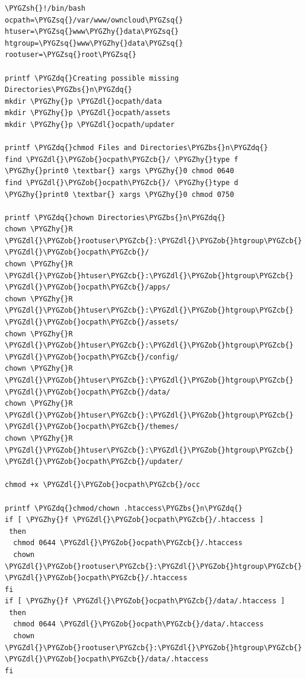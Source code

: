 \documentclass[letterpaper,10pt,english]{sphinxmanual}
\def\PYGZbs{\char`\\}
\def\PYGZob{\char`\{}
\def\PYGZcb{\char`\}}
\def\PYGZsh{\char`\#}
\def\PYGZdl{\char`\$}
\def\PYGZhy{\char`\-}
\def\PYGZsq{\char`\'}
\def\PYGZdq{\char`\"}
\renewcommand\PYGZsq{\textquotesingle}
\begin{document}
\begin{Verbatim}[commandchars=\\\{\}]
\PYGZsh{}!/bin/bash
ocpath=\PYGZsq{}/var/www/owncloud\PYGZsq{}
htuser=\PYGZsq{}www\PYGZhy{}data\PYGZsq{}
htgroup=\PYGZsq{}www\PYGZhy{}data\PYGZsq{}
rootuser=\PYGZsq{}root\PYGZsq{}

printf \PYGZdq{}Creating possible missing Directories\PYGZbs{}n\PYGZdq{}
mkdir \PYGZhy{}p \PYGZdl{}ocpath/data
mkdir \PYGZhy{}p \PYGZdl{}ocpath/assets
mkdir \PYGZhy{}p \PYGZdl{}ocpath/updater

printf \PYGZdq{}chmod Files and Directories\PYGZbs{}n\PYGZdq{}
find \PYGZdl{}\PYGZob{}ocpath\PYGZcb{}/ \PYGZhy{}type f \PYGZhy{}print0 \textbar{} xargs \PYGZhy{}0 chmod 0640
find \PYGZdl{}\PYGZob{}ocpath\PYGZcb{}/ \PYGZhy{}type d \PYGZhy{}print0 \textbar{} xargs \PYGZhy{}0 chmod 0750

printf \PYGZdq{}chown Directories\PYGZbs{}n\PYGZdq{}
chown \PYGZhy{}R \PYGZdl{}\PYGZob{}rootuser\PYGZcb{}:\PYGZdl{}\PYGZob{}htgroup\PYGZcb{} \PYGZdl{}\PYGZob{}ocpath\PYGZcb{}/
chown \PYGZhy{}R \PYGZdl{}\PYGZob{}htuser\PYGZcb{}:\PYGZdl{}\PYGZob{}htgroup\PYGZcb{} \PYGZdl{}\PYGZob{}ocpath\PYGZcb{}/apps/
chown \PYGZhy{}R \PYGZdl{}\PYGZob{}htuser\PYGZcb{}:\PYGZdl{}\PYGZob{}htgroup\PYGZcb{} \PYGZdl{}\PYGZob{}ocpath\PYGZcb{}/assets/
chown \PYGZhy{}R \PYGZdl{}\PYGZob{}htuser\PYGZcb{}:\PYGZdl{}\PYGZob{}htgroup\PYGZcb{} \PYGZdl{}\PYGZob{}ocpath\PYGZcb{}/config/
chown \PYGZhy{}R \PYGZdl{}\PYGZob{}htuser\PYGZcb{}:\PYGZdl{}\PYGZob{}htgroup\PYGZcb{} \PYGZdl{}\PYGZob{}ocpath\PYGZcb{}/data/
chown \PYGZhy{}R \PYGZdl{}\PYGZob{}htuser\PYGZcb{}:\PYGZdl{}\PYGZob{}htgroup\PYGZcb{} \PYGZdl{}\PYGZob{}ocpath\PYGZcb{}/themes/
chown \PYGZhy{}R \PYGZdl{}\PYGZob{}htuser\PYGZcb{}:\PYGZdl{}\PYGZob{}htgroup\PYGZcb{} \PYGZdl{}\PYGZob{}ocpath\PYGZcb{}/updater/

chmod +x \PYGZdl{}\PYGZob{}ocpath\PYGZcb{}/occ

printf \PYGZdq{}chmod/chown .htaccess\PYGZbs{}n\PYGZdq{}
if [ \PYGZhy{}f \PYGZdl{}\PYGZob{}ocpath\PYGZcb{}/.htaccess ]
 then
  chmod 0644 \PYGZdl{}\PYGZob{}ocpath\PYGZcb{}/.htaccess
  chown \PYGZdl{}\PYGZob{}rootuser\PYGZcb{}:\PYGZdl{}\PYGZob{}htgroup\PYGZcb{} \PYGZdl{}\PYGZob{}ocpath\PYGZcb{}/.htaccess
fi
if [ \PYGZhy{}f \PYGZdl{}\PYGZob{}ocpath\PYGZcb{}/data/.htaccess ]
 then
  chmod 0644 \PYGZdl{}\PYGZob{}ocpath\PYGZcb{}/data/.htaccess
  chown \PYGZdl{}\PYGZob{}rootuser\PYGZcb{}:\PYGZdl{}\PYGZob{}htgroup\PYGZcb{} \PYGZdl{}\PYGZob{}ocpath\PYGZcb{}/data/.htaccess
fi
\end{Verbatim}
\end{document}
